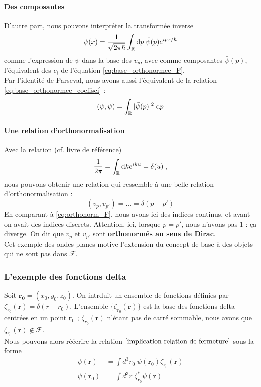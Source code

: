 \documentclass[../notesdecours.tex]{subfiles}
\begin{document}
\paragraph{Des composantes}
D'autre part, nous pouvons interpréter la transformée inverse
$$\psi(x) = \dfrac{1}{\sqrt{2\pi\hbar}} \int_{\mathbb R}\mathrm{d} p \; \bar\psi(p) e^{ipx/\hbar}$$
comme l'expression de $\psi$ dans la base des $v_p$, avec comme composantes $\bar \psi(p)$, l'équivalent des $c_i$ de l'équation \eqref{eq:base_orthonormee_F}. \\

Par l'identité de Parseval, nous avons aussi l'équivalent de la relation \eqref{eq:base_orthonormee_coeffsci} :
$$(\psi, \psi) = \int_{\mathbb R} |\bar \psi(p)|^2 \; \mathrm{d} p$$
\paragraph{Une relation d'orthonormalisation}
Avec la relation (cf. livre de référence) 
$$\dfrac{1}{2\pi} = \int_{\mathbb R} \mathrm{d} k e^{iku} = \delta(u) \; ,$$
nous pouvons obtenir une relation qui ressemble à une belle relation d'orthonormalisation :
$$(v_p, v_{p'}) = ... = \delta(p-p')$$
En comparant à \eqref{eq:orthonorm_F}, nous avons ici des indices continus, et avant on avait des indices discrets. Attention, ici, lorsque $p = p'$, nous n'avons pas $1$ : ça diverge. On dit que $v_p$ et $v_{p'}$ sont \textbf{orthonormés au sens de Dirac}. \\

Cet exemple des ondes planes motive l'extension du concept de base à des objets qui ne sont pas dans $\mathcal{F}$.
\subsubsection{L'exemple des fonctions delta}
Soit $\bm{r_0} = (x_0,y_0,z_0)$. On intrduit un ensemble de fonctions définies par $\zeta_{r_0} (\bm{r}) = \delta(r-r_0)$. L'ensemble $\{\zeta_{r_0}(\bm{r})\}$ est la base des fonctions delta centrées en un point $\bm{r}_0$ ; $\zeta_{r_0} (\bm{r})$ n'étant pas de carré sommable, nous avons que $\zeta_{r_0} (\bm{r}) \notin \mathcal{F}$.\\

Nous pouvons alors réécrire la relation $\eqref{implication relation de fermeture}$ sous la forme
\begin{align}
\psi (\bm{r}) &= \int d^3r_0 \; \psi(\bm{r}_0)\zeta_{r_0} (\bm{r})\\
\psi (\bm{r}_0) &= \int d^3r \; \zeta_{\bm{r}_0}^* \psi(\bm{r})
\end{align}
\end{document}
